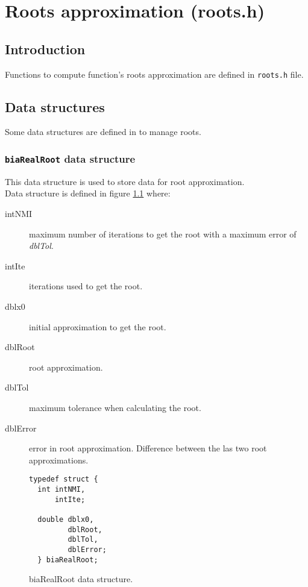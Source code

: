 %
%

\chapter{Roots approximation (roots.h)} \label{sec:roots}

\section{Introduction}

Functions to compute function's roots approximation are defined in \texttt{roots.h} file.

\section{Data structures}

Some data structures are defined in \BI to manage roots.

\subsection{\texttt{biaRealRoot} data structure} \label{sec:biaRealRoot}

This data structure is used to store data for root approximation.\\

Data structure is defined in figure \ref{fig:biaRealRoot} where:
%
\begin{description}
\item[intNMI] maximum number of iterations to get the root with a maximum error of \emph{dblTol}.
\item[intIte] iterations used to get the root.
\item[dblx0] initial approximation to get the root.
\item[dblRoot] root approximation.
\item[dblTol] maximum tolerance when calculating the root.
\item[dblError] error in root approximation. Difference between the las two root approximations.
\end{description}
%
\begin{figure}[!h]
\begin{verbatim}
typedef struct {
  int intNMI,
      intIte;

  double dblx0,
         dblRoot,
         dblTol,
         dblError;
  } biaRealRoot;
\end{verbatim}
\caption{biaRealRoot data structure.} \label{fig:biaRealRoot}
\end{figure}


